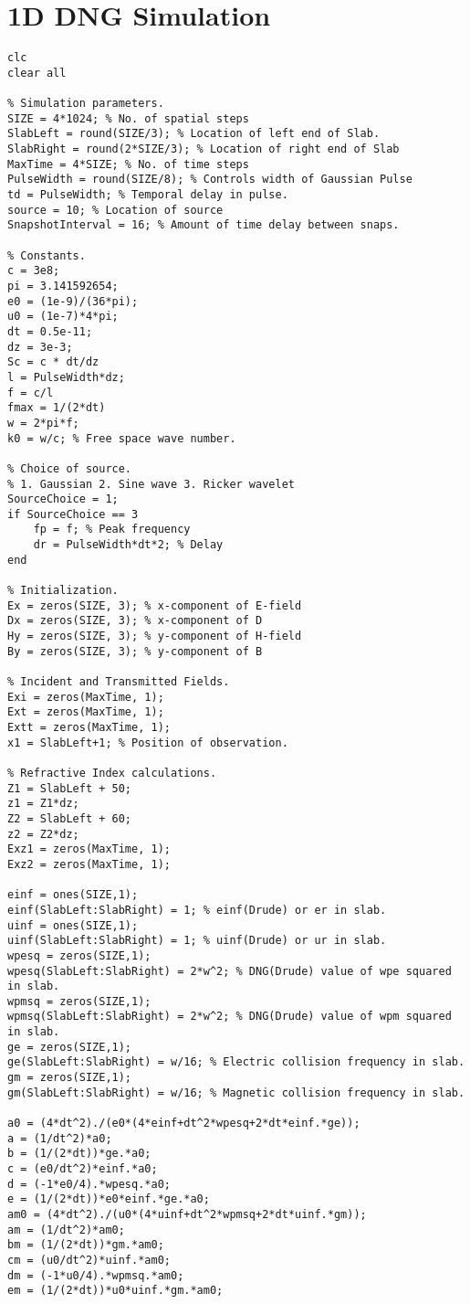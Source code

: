 \chapter{1D DNG Simulation}
\label{App:1DFDTDDNGMatlab}
\begin{lstlisting}
clc
clear all

% Simulation parameters.
SIZE = 4*1024; % No. of spatial steps
SlabLeft = round(SIZE/3); % Location of left end of Slab.
SlabRight = round(2*SIZE/3); % Location of right end of Slab
MaxTime = 4*SIZE; % No. of time steps
PulseWidth = round(SIZE/8); % Controls width of Gaussian Pulse
td = PulseWidth; % Temporal delay in pulse.
source = 10; % Location of source
SnapshotInterval = 16; % Amount of time delay between snaps.

% Constants.
c = 3e8;
pi = 3.141592654;
e0 = (1e-9)/(36*pi);
u0 = (1e-7)*4*pi;
dt = 0.5e-11;
dz = 3e-3;
Sc = c * dt/dz
l = PulseWidth*dz;
f = c/l
fmax = 1/(2*dt)
w = 2*pi*f;
k0 = w/c; % Free space wave number.

% Choice of source.
% 1. Gaussian 2. Sine wave 3. Ricker wavelet
SourceChoice = 1;
if SourceChoice == 3
    fp = f; % Peak frequency
    dr = PulseWidth*dt*2; % Delay
end

% Initialization.
Ex = zeros(SIZE, 3); % x-component of E-field
Dx = zeros(SIZE, 3); % x-component of D
Hy = zeros(SIZE, 3); % y-component of H-field
By = zeros(SIZE, 3); % y-component of B

% Incident and Transmitted Fields.
Exi = zeros(MaxTime, 1);
Ext = zeros(MaxTime, 1);
Extt = zeros(MaxTime, 1);
x1 = SlabLeft+1; % Position of observation.

% Refractive Index calculations.
Z1 = SlabLeft + 50;
z1 = Z1*dz;
Z2 = SlabLeft + 60;
z2 = Z2*dz;
Exz1 = zeros(MaxTime, 1);
Exz2 = zeros(MaxTime, 1);

einf = ones(SIZE,1);
einf(SlabLeft:SlabRight) = 1; % einf(Drude) or er in slab.
uinf = ones(SIZE,1);
uinf(SlabLeft:SlabRight) = 1; % uinf(Drude) or ur in slab.
wpesq = zeros(SIZE,1);
wpesq(SlabLeft:SlabRight) = 2*w^2; % DNG(Drude) value of wpe squared in slab.
wpmsq = zeros(SIZE,1);
wpmsq(SlabLeft:SlabRight) = 2*w^2; % DNG(Drude) value of wpm squared in slab.
ge = zeros(SIZE,1);
ge(SlabLeft:SlabRight) = w/16; % Electric collision frequency in slab.
gm = zeros(SIZE,1);
gm(SlabLeft:SlabRight) = w/16; % Magnetic collision frequency in slab.

a0 = (4*dt^2)./(e0*(4*einf+dt^2*wpesq+2*dt*einf.*ge));
a = (1/dt^2)*a0;
b = (1/(2*dt))*ge.*a0;
c = (e0/dt^2)*einf.*a0;
d = (-1*e0/4).*wpesq.*a0;
e = (1/(2*dt))*e0*einf.*ge.*a0;
am0 = (4*dt^2)./(u0*(4*uinf+dt^2*wpmsq+2*dt*uinf.*gm));
am = (1/dt^2)*am0;
bm = (1/(2*dt))*gm.*am0;
cm = (u0/dt^2)*uinf.*am0;
dm = (-1*u0/4).*wpmsq.*am0;
em = (1/(2*dt))*u0*uinf.*gm.*am0;


\end{lstlisting}
